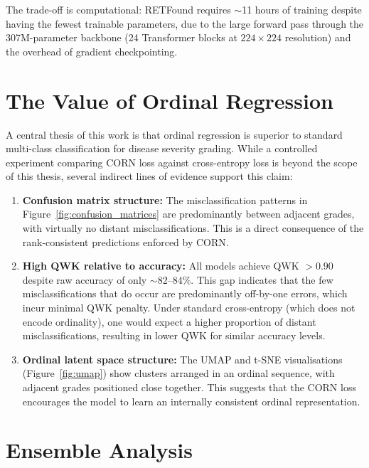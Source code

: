 The trade-off is computational: RETFound requires $\sim$11 hours of training despite having the fewest trainable parameters, due to the large forward pass through the 307M-parameter backbone (24 Transformer blocks at $224 \times 224$ resolution) and the overhead of gradient checkpointing.

\section{The Value of Ordinal Regression}
\label{sec:ordinal_value}

A central thesis of this work is that ordinal regression is superior to standard multi-class classification for disease severity grading. While a controlled experiment comparing CORN loss against cross-entropy loss is beyond the scope of this thesis, several indirect lines of evidence support this claim:

\begin{enumerate}
    \item \textbf{Confusion matrix structure:} The misclassification patterns in Figure~\ref{fig:confusion_matrices} are predominantly between adjacent grades, with virtually no distant misclassifications. This is a direct consequence of the rank-consistent predictions enforced by CORN.
    
    \item \textbf{High QWK relative to accuracy:} All models achieve QWK $> 0.90$ despite raw accuracy of only $\sim$82--84\%. This gap indicates that the few misclassifications that do occur are predominantly off-by-one errors, which incur minimal QWK penalty. Under standard cross-entropy (which does not encode ordinality), one would expect a higher proportion of distant misclassifications, resulting in lower QWK for similar accuracy levels.
    
    \item \textbf{Ordinal latent space structure:} The UMAP and t-SNE visualisations (Figure~\ref{fig:umap}) show clusters arranged in an ordinal sequence, with adjacent grades positioned close together. This suggests that the CORN loss encourages the model to learn an internally consistent ordinal representation.
\end{enumerate}

\section{Ensemble Analysis}
\label{sec:ensemble_analysis}

